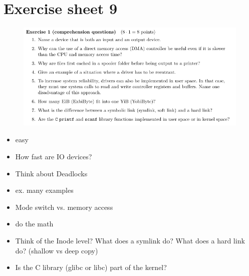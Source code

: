 \documentclass[10pt]{beamer}
\begin{document}
        \section*{Exercise sheet 9}
        \frame{\sectionpage}
        \begin{frame}{}
            \begin{figure}
                \includegraphics[keepaspectratio, width=\textwidth, height=\textheight-2\baselineskip-2\baselineskip]{img/ex9_100.png} \\
            \end{figure}
            \framebreak
            \begin{itemize}
                \item easy
                \item How fast are IO devices?
                \item Think about Deadlocks
                \item ex. many examples
                \item Mode switch vs. memory access
                \item do the math
                \item Think of the Inode level? What does a symlink do? What does a hard link do? (shallow vs deep copy)
                \item Is the C library (glibc or libc) part of the kernel?
            \end{itemize}
            \framebreak


\end{frame}
\end{document}
